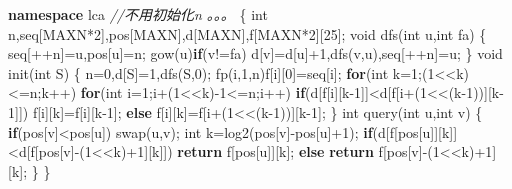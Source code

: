 \documentclass[
]{article}
\newenvironment{Shaded}{}{}
\newcommand{\CommentTok}[1]{\textcolor[rgb]{0.38,0.63,0.69}{\textit{#1}}}
\newcommand{\ControlFlowTok}[1]{\textcolor[rgb]{0.00,0.44,0.13}{\textbf{#1}}}
\newcommand{\DataTypeTok}[1]{\textcolor[rgb]{0.56,0.13,0.00}{#1}}
\newcommand{\DecValTok}[1]{\textcolor[rgb]{0.25,0.63,0.44}{#1}}
\newcommand{\KeywordTok}[1]{\textcolor[rgb]{0.00,0.44,0.13}{\textbf{#1}}}
\newcommand{\NormalTok}[1]{#1}
\begin{document}
\begin{Shaded}
\begin{Highlighting}[]
\KeywordTok{namespace}\NormalTok{ lca }\CommentTok{//不用初始化n 。。。}
\NormalTok{\{}
    \DataTypeTok{int}\NormalTok{ n,seq[MAXN*}\DecValTok{2}\NormalTok{],pos[MAXN],d[MAXN],f[MAXN*}\DecValTok{2}\NormalTok{][}\DecValTok{25}\NormalTok{];}
    \DataTypeTok{void}\NormalTok{ dfs(}\DataTypeTok{int}\NormalTok{ u,}\DataTypeTok{int}\NormalTok{ fa)}
\NormalTok{    \{}
\NormalTok{        seq[++n]=u,pos[u]=n;}
\NormalTok{        gow(u)}\ControlFlowTok{if}\NormalTok{(v!=fa)}
\NormalTok{            d[v]=d[u]+}\DecValTok{1}\NormalTok{,dfs(v,u),seq[++n]=u;}
\NormalTok{    \}}
    \DataTypeTok{void}\NormalTok{ init(}\DataTypeTok{int}\NormalTok{ S)}
\NormalTok{    \{}
\NormalTok{        n=}\DecValTok{0}\NormalTok{,d[S]=}\DecValTok{1}\NormalTok{,dfs(S,}\DecValTok{0}\NormalTok{);}
\NormalTok{        fp(i,}\DecValTok{1}\NormalTok{,n)f[i][}\DecValTok{0}\NormalTok{]=seq[i];}
        \ControlFlowTok{for}\NormalTok{(}\DataTypeTok{int}\NormalTok{ k=}\DecValTok{1}\NormalTok{;(}\DecValTok{1}\NormalTok{\textless{}\textless{}k)\textless{}=n;k++)}
            \ControlFlowTok{for}\NormalTok{(}\DataTypeTok{int}\NormalTok{ i=}\DecValTok{1}\NormalTok{;i+(}\DecValTok{1}\NormalTok{\textless{}\textless{}k){-}}\DecValTok{1}\NormalTok{\textless{}=n;i++)}
                \ControlFlowTok{if}\NormalTok{(d[f[i][k{-}}\DecValTok{1}\NormalTok{]]\textless{}d[f[i+(}\DecValTok{1}\NormalTok{\textless{}\textless{}(k{-}}\DecValTok{1}\NormalTok{))][k{-}}\DecValTok{1}\NormalTok{]])}
\NormalTok{                        f[i][k]=f[i][k{-}}\DecValTok{1}\NormalTok{];}
                    \ControlFlowTok{else}
\NormalTok{                        f[i][k]=f[i+(}\DecValTok{1}\NormalTok{\textless{}\textless{}(k{-}}\DecValTok{1}\NormalTok{))][k{-}}\DecValTok{1}\NormalTok{];}
\NormalTok{    \}}
    \DataTypeTok{int}\NormalTok{ query(}\DataTypeTok{int}\NormalTok{ u,}\DataTypeTok{int}\NormalTok{ v)}
\NormalTok{    \{}
        \ControlFlowTok{if}\NormalTok{(pos[v]\textless{}pos[u]) swap(u,v);}
        \DataTypeTok{int}\NormalTok{ k=log2(pos[v]{-}pos[u]+}\DecValTok{1}\NormalTok{);}
        \ControlFlowTok{if}\NormalTok{(d[f[pos[u]][k]]\textless{}d[f[pos[v]{-}(}\DecValTok{1}\NormalTok{\textless{}\textless{}k)+}\DecValTok{1}\NormalTok{][k]])}
            \ControlFlowTok{return}\NormalTok{ f[pos[u]][k];}
        \ControlFlowTok{else}
            \ControlFlowTok{return}\NormalTok{ f[pos[v]{-}(}\DecValTok{1}\NormalTok{\textless{}\textless{}k)+}\DecValTok{1}\NormalTok{][k];}
\NormalTok{    \}}
\NormalTok{\}}
\end{Highlighting}
\end{Shaded}
\end{document}
